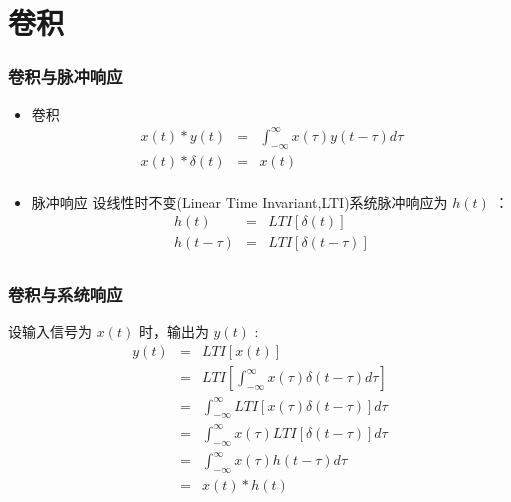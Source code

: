\documentclass{beamer}
\begin{document}
\section{卷积}
\label{sec-3}
\begin{frame}
\frametitle{卷积与脉冲响应}
\label{sec-3-1}

\begin{itemize}
\item 卷积
      \begin{eqnarray*}
      x(t)*y(t) &=& \int_{-\infty}^{\infty}x(\tau)y(t-\tau)d\tau \\
      x(t)*\delta(t)& = & x(t) \\
      \end{eqnarray*}
\item 脉冲响应
     设线性时不变(Linear Time Invariant,LTI)系统脉冲响应为 $h(t)$ ：
      \begin{eqnarray*}
      h(t) &=& LTI[\delta(t)]\\
      h(t-\tau) &=& LTI[\delta(t-\tau)]\\
      \end{eqnarray*}
\end{itemize}
\end{frame}
\begin{frame}
\frametitle{卷积与系统响应}
\label{sec-3-2}

设输入信号为 $x(t)$ 时，输出为 $y(t)$ :
\begin{eqnarray*}
y(t) & =& LTI[x(t)]\\
     &=& LTI\left[\int_{-\infty}^{\infty}x(\tau)\delta(t-\tau)d\tau\right] \\
     &=& \int_{-\infty}^{\infty} LTI[x(\tau)\delta(t-\tau)]d\tau \\
     &=& \int_{-\infty}^{\infty} x(\tau)LTI[\delta(t-\tau)]d\tau \\
     &=& \int_{-\infty}^{\infty} x(\tau) h(t-\tau)d\tau \\
     &=& x(t) * h(t)
\end{eqnarray*}
\end{frame}
\end{document}

